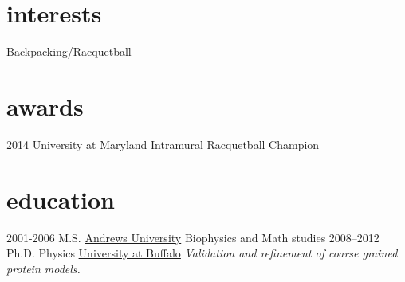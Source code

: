\documentclass[]{twentysecondcv}
\begin{document}






\section{interests}
Backpacking/Racquetball


\section{awards}
\begin{twentyshort}
      \twentyitemshort
      {2014}
        {University at Maryland Intramural Racquetball Champion}
\end{twentyshort}


\makeprofile


\section{education}

\begin{twenty}
  \twentyitem
    {2001-2006}
    {M.S.}
    {\href{www.andrews.edu}{Andrews University}}
    {Biophysics and Math studies}
  \twentyitem
    {2008--2012}
    {Ph.D. {\normalfont Physics}}
    {\href{www.buffalo.edu}{University at Buffalo}}
    {\emph{Validation and refinement of coarse grained protein models.}}
\end{twenty}
\end{document}
